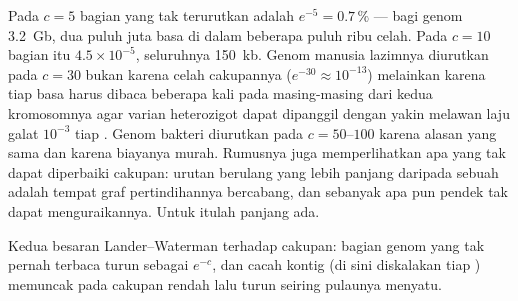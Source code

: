 \begin{example}\label{ex:b3:genomics:coverage}
Pada $c = 5$ bagian yang tak terurutkan adalah $e^{-5} = 0.7\,\%$ --- bagi
genom \qty{3.2}{Gb}, dua puluh juta basa di dalam beberapa puluh ribu celah.
Pada $c = 10$ bagian itu $4.5\times 10^{-5}$, seluruhnya \qty{150}{kb}.
Genom manusia lazimnya diurutkan pada $c = 30$ bukan karena celah cakupannya
($e^{-30} \approx 10^{-13}$) melainkan karena tiap basa harus dibaca beberapa
kali pada masing-masing dari kedua kromosomnya agar varian heterozigot dapat
dipanggil dengan yakin melawan laju galat $10^{-3}$ tiap . Genom
bakteri diurutkan pada $c = 50$--$100$ karena alasan yang sama dan karena
biayanya murah. Rumusnya juga memperlihatkan apa yang tak dapat diperbaiki
cakupan: urutan berulang yang lebih panjang daripada sebuah  adalah
tempat graf pertindihannya bercabang, dan sebanyak apa pun  pendek tak
dapat menguraikannya. Untuk itulah  panjang ada.
\end{example}

\begin{omfigure}

{\small Kedua besaran Lander--Waterman terhadap cakupan: bagian
genom yang tak pernah terbaca turun sebagai $e^{-c}$, dan cacah
kontig (di sini diskalakan tiap ) memuncak pada cakupan rendah lalu
turun seiring pulaunya menyatu.}
\end{omfigure}

